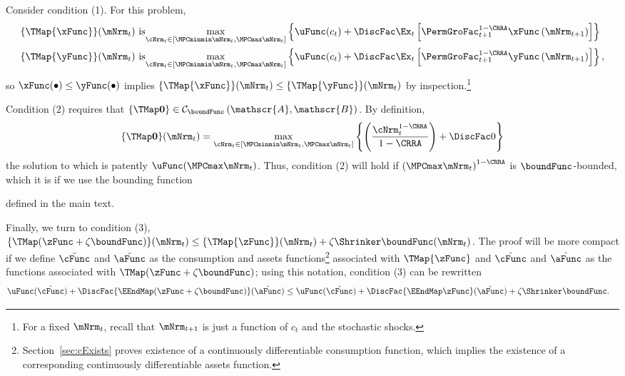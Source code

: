 \documentclass[\econtexRoot/BufferStockTheory]{subfiles}
\begin{document}
Consider condition (1). For this problem,
\begin{align*}
  \{\TMap{\mathfrak{\xFunc}}\}(\mNrm_{t}) &\mbox{~is}\underset{\cNrm_{t} \in
                                            [\MPCminmin \mNrm_{t}, \MPCmax \mNrm_{t}]
                                            }\max \left\{
                                            \uFunc(c_{t})+\DiscFac \Ex_{t}\left[ {\PermGroFac}_{t+1}^{1-\CRRA }{\mathfrak{\xFunc}}
                                            \left( {\mNrm}_{t+1}\right) \right] \right\}  \notag  \label{eq:condition1}
  \\
  \{\TMap{\mathfrak{\yFunc}}\}(\mNrm_{t}) &\mbox{~is}\underset{\cNrm_{t} \in
                                            [\MPCminmin \mNrm_{t}, \MPCmax \mNrm_{t}]
                                            }\max \left\{
                                            \uFunc(c_{t})+\DiscFac \Ex_{t}\left[ {\PermGroFac}_{t+1}^{1-\CRRA }{\mathfrak{\yFunc}}
                                            \left( {\mNrm}_{t+1}\right) \right] \right\} ,  \notag
\end{align*}%
so ${\mathfrak{\xFunc}}(\bullet) \leq {\mathfrak{\yFunc}}(\bullet)$ implies $\{\TMap{\mathfrak{\xFunc}}\}(\mNrm_{t}) \leq \{\TMap{\mathfrak{\yFunc}} \}(\mNrm_{t})$ by inspection.\footnote{For a fixed $\mNrm_{t}$, recall that ${\mNrm}_{t+1}$ is just a function of $c_{t}$ and the
  stochastic shocks.}

Condition (2) requires that $\{\TMap\mathbf{0}\}\in \mathcal{C}_{\boundFunc}\left(\mathscr{A},\mathscr{B}\right)$. By definition,
\begin{equation*}
  \{\TMap \mathbf{0}\}(\mNrm_{t}) = \max_{\cNrm_{t} \in
    [\MPCminmin \mNrm_{t}, \MPCmax \mNrm_{t}]
  }\left\{ \left( \frac{\cNrm_{t}^{1-\CRRA }}{1-\CRRA }\right) +\DiscFac 0\right\}
\end{equation*}
the solution to which is patently
$\uFunc(\MPCmax \mNrm_{t})$. Thus, condition (2)
will hold if ${(\MPCmax \mNrm_{t})}^{1-\CRRA}$ is $\boundFunc$-bounded, which it is if we use the
bounding function

defined in the main text.

Finally, we turn to condition (3), $\{\TMap({\zFunc} +\zeta\boundFunc
)\}(\mNrm_{t}) \leq \{\TMap{\zFunc}\}(\mNrm_{t}) +\zeta \Shrinker
\boundFunc(\mNrm_{t})$. The proof will be more compact if we define
$\breve{\cFunc}$ and $\breve{\aFunc}$ as the consumption and assets
functions\footnote{Section~\ref{sec:cExists} proves existence of a
  continuously differentiable consumption function, which implies the
  existence of a corresponding continuously differentiable assets
  function.}  associated with $\TMap{\zFunc}$ and $\hat{\cFunc}$ and
$\hat{\aFunc}$ as the functions associated with $\TMap({\zFunc+\zeta
  \boundFunc})$; using this notation, condition (3) can be rewritten
\begin{align*}
  \uFunc(\hat{\cFunc})+\DiscFac \{\EEndMap (\zFunc+\zeta \boundFunc) \}(\hat{\aFunc})  & \leq  \uFunc(\breve{\cFunc})+\DiscFac \{\EEndMap \zFunc \}(\breve{\aFunc})  + \zeta \Shrinker \boundFunc.
\end{align*}
\end{document}
